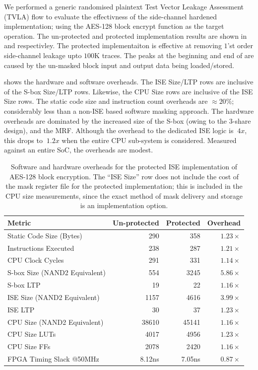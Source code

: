 We performed a generic randomised plaintext
Test Vector Leakage Assessment (TVLA) \cite{TVLA:13}
flow to evaluate the effectivness of the side-channel hardened implementation;
using the AES-128 block encrypt function as the target operation.
The un-protected and protected implementation results are shown in
 and
 respectivley.
The protected implementaiton is effective at removing $1$'st
order side-channel leakage upto $100$K traces.
The peaks at the beginning and end of 
are caused by the un-masked block input and output data being loaded/stored.

 shows the hardware and software overheads.
The ISE Size/LTP rows are inclusive of the S-box Size/LTP rows.
Likewise, the CPU Size rows are inclusive of the ISE Size rows.
The static code size and instruction count overheads are
$\approx 20\%$; considerably less than a non-ISE based software masking
approach.
The hardware overheads are dominated by the increased size of the
S-box (owing to the 3-share design), and the MRF.
Although the overhead to the dedicated
ISE logic is $~4x$, this drops to $~1.2x$ when the entire
CPU sub-system is considered.
Measured against an entire SoC, the overheads are modest.

\begin{table}[]
\centering
\begin{tabular}{|l|r|r|r|}
\hline
Metric  & Un-protected & Protected  & Overhead \\
\hline
\hline
Static Code Size (Bytes)        & 290         & 358    & $1.23\times$   \\
Instructions Executed           & 238         & 287    & $1.21\times$   \\
CPU Clock Cycles                & 291         & 331    & $1.14\times$   \\
\hline
S-box Size (NAND2 Equivalent)   & 554         & 3245   & $5.86\times$   \\
S-box LTP                       & 19          & 22     & $1.16\times$   \\
ISE Size (NAND2 Equivalent)     & 1157        & 4616   & $3.99\times$   \\
ISE LTP                         & 30          & 37     & $1.23\times$   \\
CPU Size (NAND2 Equivalent)     & 38610       & 45141  & $1.16\times$   \\
CPU Size  LUTs                  & 4017        & 4956   & $1.23\times$   \\
CPU Size  FFs                   & 2078        & 2420   & $1.16\times$   \\
FPGA Timing Slack @50MHz        & 8.12ns      & 7.05ns & $0.87\times$   \\
\hline
\end{tabular}
\caption{
Software and hardware overheads for the protected ISE implementation
of AES-128 block encryption.
The ``ISE Size'' row does not include the cost of the mask register file
for the protected implementation;
this is included in the CPU size measurements, since the exact method
of mask delivery and storage is an implementation option.
}
\label{tab:sca:sw-hw}
\end{table}

